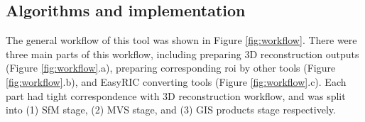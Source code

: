 \documentclass[sensors,article,submit,moreauthors, xelatex]{Definitions/mdpi}
\begin{document}
\begin{table}[H]
  \caption{Trail field and image collection information}
  \centering
  \label{tab:diginfo}
\end{table}

\subsection{Algorithms and implementation}

The general workflow of this tool was shown in Figure \ref{fig:workflow}. There were three main parts of this workflow, including preparing 3D reconstruction outputs (Figure \ref{fig:workflow}.a), preparing corresponding \acrfull*{roi} by other tools (Figure \ref{fig:workflow}.b), and EasyRIC converting tools (Figure \ref{fig:workflow}.c). Each part had tight correspondence with 3D reconstruction workflow, and was split into (1) SfM stage, (2) MVS stage, and (3) GIS products stage respectively.
\end{document}
